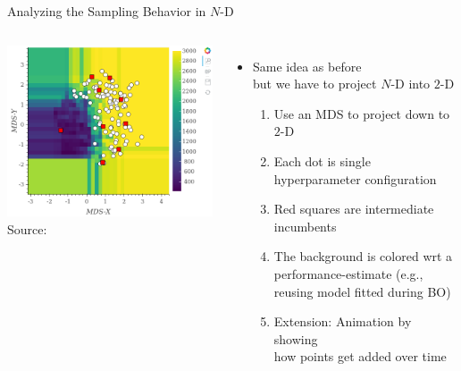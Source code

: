 \begin{frame}[c]{Analyzing the Sampling Behavior in $N$-D}


\begin{columns}
	
	\begin{center}
		\includegraphics[width=1.0\textwidth]{images/configurator_footprint0.png}\\
		Source: 
	\end{center}
	
	
	\begin{itemize}
		\item Same idea as before\\
		 but we have to project $N$-D into $2$-D
		 \pause
		\begin{enumerate}
			\item Use an MDS to project down to $2$-D
					 \pause
			\item Each dot is single hyperparameter configuration
					 \pause
			\item Red squares are intermediate incumbents
					 \pause
			\item The background is colored wrt a performance-estimate (e.g., reusing model fitted during BO) 
					 \pause
			\item Extension: Animation by showing\\ how points get added over time
		\end{enumerate}
	\end{itemize}
	
\end{columns}

\end{frame}
